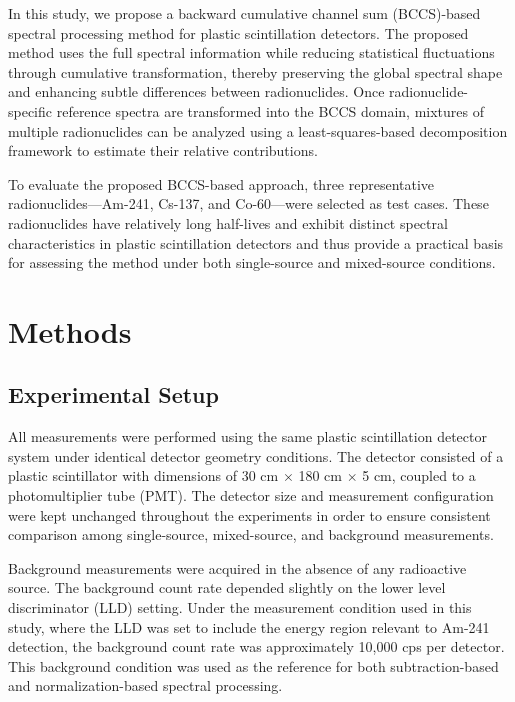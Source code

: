 \documentclass[10pt]{wlscirep}
\begin{document}
In this study, we propose a backward cumulative channel sum (BCCS)-based spectral processing method for plastic scintillation detectors. The proposed method uses the full spectral information while reducing statistical fluctuations through cumulative transformation, thereby preserving the global spectral shape and enhancing subtle differences between radionuclides. Once radionuclide-specific reference spectra are transformed into the BCCS domain, mixtures of multiple radionuclides can be analyzed using a least-squares-based decomposition framework to estimate their relative
contributions.


\color{red}To evaluate the proposed BCCS-based approach, three representative radionuclides—Am-241, Cs-137, and Co-60—were selected as test cases. These radionuclides have relatively long half-lives and exhibit distinct spectral characteristics in plastic scintillation detectors and thus provide a practical basis for assessing the method under both single-source and mixed-source conditions.\normalcolor

\section*{Methods}
\subsection*{Experimental Setup}

All measurements were performed using the same plastic scintillation detector system under identical detector geometry conditions. The detector consisted of a plastic scintillator
with dimensions of 30 cm $\times$ 180 cm $\times$ 5 cm, coupled to a photomultiplier tube (PMT). The
detector size and measurement configuration were kept unchanged throughout the experiments in order to ensure consistent comparison among single-source, mixed-source, and background measurements.

Background measurements were acquired in the absence of any radioactive source. The background count rate depended slightly on the lower level discriminator (LLD) setting. Under the measurement condition used in this study, where the LLD was set to include the energy region relevant to Am-241 detection, the background count rate was approximately 10,000 cps per detector. This background condition was used as the reference for both subtraction-based and normalization-based spectral processing.
\end{document}

